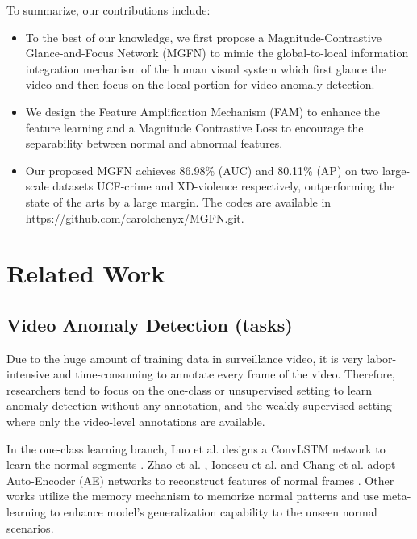 \documentclass[letterpaper]{article} \usepackage{aaai23}  \usepackage{times}  \usepackage{helvet}  \usepackage{courier}  \usepackage[hyphens]{url}  \usepackage{graphicx} \urlstyle{rm} \def\UrlFont{\rm}  \usepackage{natbib}  \usepackage{caption} \frenchspacing  \setlength{\pdfpagewidth}{8.5in}  \setlength{\pdfpageheight}{11in}  \usepackage{algorithm}
\newcommand{\etal}{{et al. }}
\begin{document}
To summarize, our contributions include:
\begin{itemize}
\item To the best of our knowledge, we first propose a Magnitude-Contrastive Glance-and-Focus Network (MGFN) to mimic the global-to-local information integration mechanism of the human visual system which first glance the video and then focus on the local portion for video anomaly detection.
\item We design the Feature Amplification Mechanism (FAM) to enhance the feature learning and a Magnitude Contrastive Loss to encourage the separability between normal and abnormal features. 
\item Our proposed MGFN achieves 86.98\% (AUC) and 80.11\% (AP) on two large-scale datasets UCF-crime \cite{RWAD} and XD-violence \cite{Not-only-look} respectively, outperforming the state of the arts by a large margin. The codes are available in \url{https://github.com/carolchenyx/MGFN.git}.
\end{itemize}


\section{Related Work}

\subsection{Video Anomaly Detection (tasks)}
\noindent Due to the huge amount of training data in surveillance video, it is very labor-intensive and time-consuming to annotate every frame of the video. Therefore, researchers tend to focus on the one-class \cite{one-class} or unsupervised setting to learn anomaly detection without any annotation, and the weakly supervised setting where only the video-level annotations are available. 

In the one-class learning branch, Luo \etal designs a ConvLSTM network to learn the normal segments \cite{un-rhc}. Zhao \etal, Ionescu \etal and Chang \etal adopt Auto-Encoder (AE) networks to reconstruct features of normal frames \cite{un-sta,un-oada,un-cdda}. Other works utilize the memory mechanism to memorize normal patterns \cite{un-mem1,un-mem2,un-mem3,un-mem4} and use meta-learning \cite{un-fsad} to enhance model's generalization capability to the unseen normal scenarios.  
\end{document}
